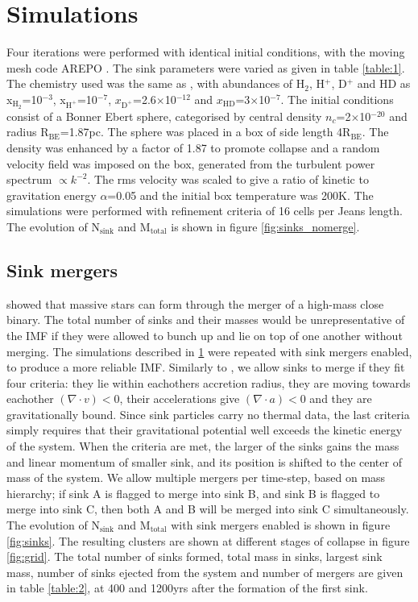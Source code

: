 \documentclass[fleqn,usenatbib]{mnras}
\begin{document}
\section{Simulations}
\label{Sims}
Four iterations were performed with identical initial conditions, with the moving mesh code AREPO \citep{Springel2010}. The sink parameters were varied as given in table \ref{table:1}. The chemistry used was the same as \cite{Clark2011}, with abundances of H$_2$, H$^{+}$, D$^{+}$ and HD as x$_{\text{H}_{2}}$=10$^{-3}$, x$_{\text{H}^{+}}$=10$^{-7}$, $x_{\text{D}^{+}}$=2.6$\times$10$^{-12}$ and $x_{\text{HD}}$=3$\times$10$^{-7}$. The initial conditions consist of a Bonner Ebert sphere, categorised by central density $n_c$=2$\times$10$^{-20}$ and radius R$_{\text{BE}}$=1.87pc. The sphere was placed in a box of side length 4R$_{\text{BE}}$. The density was enhanced by a factor of 1.87 to promote collapse and a random velocity field was imposed on the box, generated from the turbulent power spectrum $\propto k^{-2}$. The rms velocity was scaled to give a ratio of kinetic to gravitation energy $\alpha$=0.05 and the initial box temperature was 200K. The simulations were performed with refinement criteria of 16 cells per Jeans length. The evolution of N$_{\text{sink}}$ and M$_{\text{total}}$ is shown in figure \ref{fig:sinks_nomerge}.

\subsection{Sink mergers}
\cite{Bonnell2005} showed that massive stars can form through the merger of a high-mass close binary. The total number of sinks and their masses  would be unrepresentative of the IMF if they were allowed to bunch up and lie on top of one another without merging. The  simulations described in \ref{Sims} were repeated with sink mergers enabled, to produce a more reliable IMF. Similarly to \cite{Federrath2010}, we allow sinks to merge if they fit four criteria: they lie within eachothers accretion radius, they are moving towards eachother $(\nabla \cdot v) < 0$, their accelerations give $(\nabla \cdot a) <0$ and they are gravitationally bound. Since sink particles carry no thermal data, the last criteria simply requires that their gravitational potential well exceeds the kinetic energy of the system. When the criteria are met, the larger of the sinks gains the mass and linear momentum of smaller sink, and its position is shifted to the center of mass of the system. We allow multiple mergers per time-step, based on mass hierarchy; if sink A is flagged to merge into sink B, and sink B is flagged to merge into sink C, then both A and B will be merged into sink C simultaneously. The evolution of N$_{\text{sink}}$ and M$_{\text{total}}$ with sink mergers enabled is shown in figure \ref{fig:sinks}. The resulting clusters are shown at different stages of collapse in figure \ref{fig:grid}. The total number of sinks formed, total mass in sinks, largest sink mass, number of sinks ejected from the system and number of mergers are given in table \ref{table:2}, at 400 and 1200yrs after the formation of the first sink.
\end{document}
